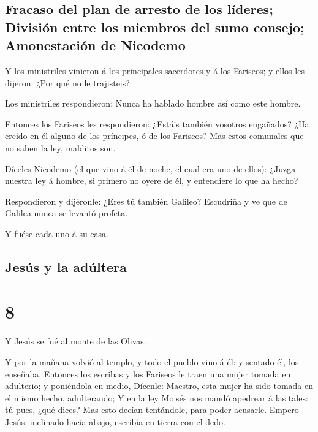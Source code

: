 \hypertarget{fracaso-del-plan-de-arresto-de-los-luxedderes-divisiuxf3n-entre-los-miembros-del-sumo-consejo-amonestaciuxf3n-de-nicodemo}{%
\subsection{Fracaso del plan de arresto de los líderes; División entre
los miembros del sumo consejo; Amonestación de
Nicodemo}\label{fracaso-del-plan-de-arresto-de-los-luxedderes-divisiuxf3n-entre-los-miembros-del-sumo-consejo-amonestaciuxf3n-de-nicodemo}}

 Y los ministriles vinieron á los principales sacerdotes
y á los Fariseos; y ellos les dijeron: ¿Por qué no le trajisteis?

 Los ministriles respondieron: Nunca ha hablado hombre
así como este hombre.

 Entonces los Fariseos les respondieron: ¿Estáis también
vosotros engañados?  ¿Ha creído en él alguno de los
príncipes, ó de los Fariseos?  Mas estos comunales que no
saben la ley, malditos son.

 Díceles Nicodemo (el que vino á él de noche, el cual era
uno de ellos):  ¿Juzga nuestra ley á hombre, si primero
no oyere de él, y entendiere lo que ha hecho?

 Respondieron y dijéronle: ¿Eres tú también Galileo?
Escudriña y ve que de Galilea nunca se levantó profeta.

 Y fuése cada uno á su casa.

\hypertarget{jesuxfas-y-la-aduxfaltera}{%
\subsection{Jesús y la adúltera}\label{jesuxfas-y-la-aduxfaltera}}

\hypertarget{section-43-8}{%
\section{8}\label{section-43-8}}

 Y Jesús se fué al monte de las Olivas.

 Y por la mañana volvió al templo, y todo el pueblo vino á
él: y sentado él, los enseñaba.  Entonces los escribas y
los Fariseos le traen una mujer tomada en adulterio; y poniéndola en
medio,  Dícenle: Maestro, esta mujer ha sido tomada en el
mismo hecho, adulterando;  Y en la ley Moisés nos mandó
apedrear á las tales: tú pues, ¿qué dices?  Mas esto
decían tentándole, para poder acusarle. Empero Jesús, inclinado hacia
abajo, escribía en tierra con el dedo.

